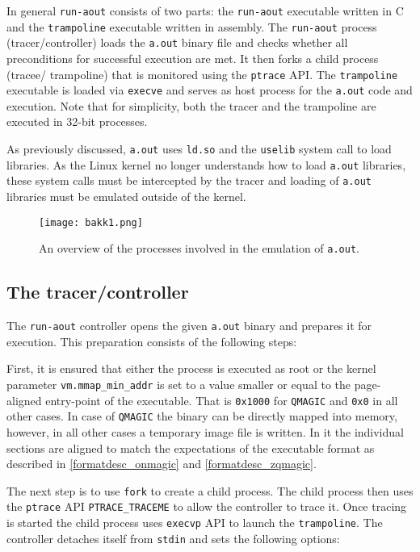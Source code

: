 \documentclass{article}
\begin{document}
In general \texttt{run-aout} consists of two parts: the \texttt{run-aout} executable written in C and the \texttt{trampoline} executable written in assembly. The \texttt{run-aout} process (tracer/controller) loads the \texttt{a.out} binary file and checks whether all preconditions for successful execution are met. It then forks a child process (tracee/ trampoline) that is monitored using the \texttt{ptrace} API. The \texttt{trampoline} executable is loaded via \texttt{execve} and serves as host process for the \texttt{a.out} code and execution. Note that for simplicity, both the tracer and the trampoline are executed in 32-bit processes.

As previously discussed, \texttt{a.out} uses \texttt{ld.so} and the \texttt{uselib} system call to load libraries. As the Linux kernel no longer understands how to load \texttt{a.out} libraries, these system calls must be intercepted by the tracer and loading of \texttt{a.out} libraries must be emulated outside of the kernel.

\begin{figure}
    \centering
    \texttt{[image: bakk1.png]}
    \caption{An overview of the processes involved in the emulation of \texttt{a.out}.}
    \label{fig:architecture_overview}
\end{figure}

\subsection{The tracer/controller}
\label{solution_tracer}

The \texttt{run-aout} controller opens the given \texttt{a.out} binary and prepares it for execution. This preparation consists of the following steps:

First, it is ensured that either the process is executed as root or the kernel parameter \texttt{vm.mmap\_min\_addr} is set to a value smaller or equal to the page-aligned entry-point of the executable. That is \texttt{0x1000} for \texttt{QMAGIC} and \texttt{0x0} in all other cases. In case of \texttt{QMAGIC} the binary can be directly mapped into memory, however, in all other cases a temporary image file is written. In it the individual sections are aligned to match the expectations of the executable format as described in \ref{formatdesc_onmagic} and \ref{formatdesc_zqmagic}.

The next step is to use \texttt{fork} to create a child process. The child process then uses the \texttt{ptrace} API \texttt{PTRACE\_TRACEME} to allow the controller to trace it. Once tracing is started the child process uses \texttt{execvp} API to launch the \texttt{trampoline}. The controller detaches itself from \texttt{stdin} and sets the following options:
\end{document}

